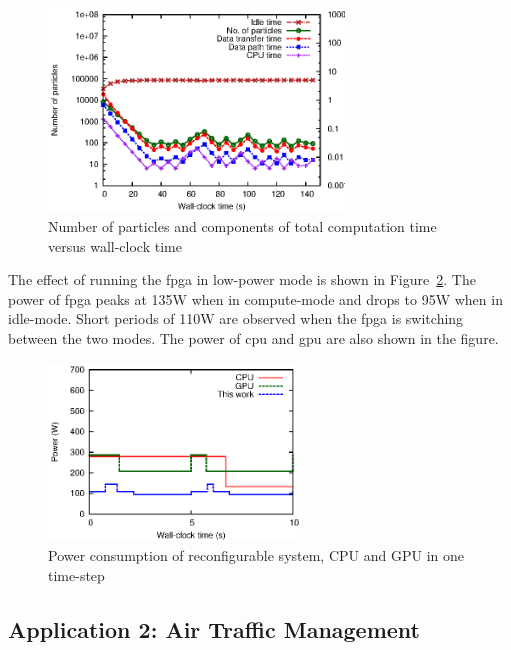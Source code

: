 \begin{figure}[t!]
\centering
\includegraphics[width=0.7\textwidth]{4_adaptation/figures/fig_adaptive}
\caption{Number of particles and components of total computation time versus wall-clock time}
\label{fig:adaptiveb}
\end{figure}

The effect of running the \gls{fpga} in low-power mode is shown in Figure~\ref{fig:powerb}.
The power of \gls{fpga} peaks at 135W when in compute-mode and drops to 95W when in idle-mode.
Short periods of 110W are observed when the \gls{fpga} is switching between the two modes.
The power of \gls{cpu} and \gls{gpu} are also shown in the figure.

\begin{figure}[t!]
\centering
\includegraphics[width=0.6\textwidth]{5_tool/figures/fig_power}
\caption[Power consumption of reconfigurable system, CPU and GPU in one time-step]{Power consumption of reconfigurable system, CPU and GPU in one time-step}
\label{fig:powerb}
\end{figure}

\subsection{Application 2: Air Traffic Management}

